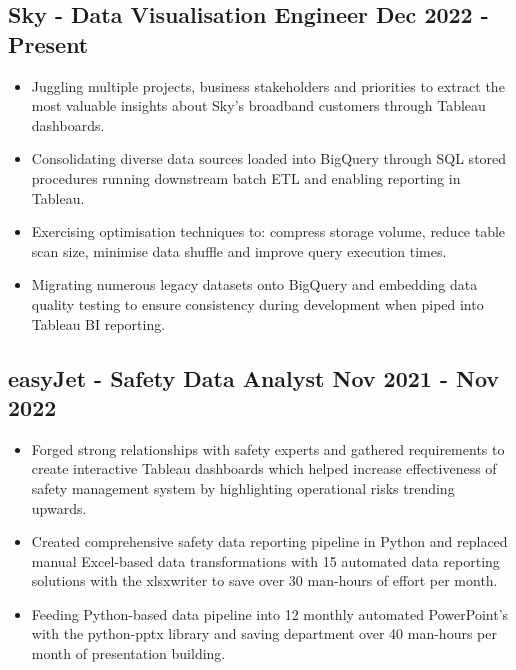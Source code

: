 \documentclass[a4paper,9pt]{article}
\begin{document}
\subsection*{\textbf{Sky - Data Visualisation Engineer} \hfill  Dec 2022 - Present}
\begin{itemize}[noitemsep]
    \item Juggling multiple projects, business stakeholders and priorities to extract the most valuable insights about Sky's broadband customers through Tableau dashboards.
    \item Consolidating diverse data sources loaded into BigQuery through SQL stored procedures running downstream batch ETL and enabling reporting in Tableau.
    \item Exercising optimisation techniques to: compress storage volume, reduce table scan size, minimise data shuffle and improve query execution times.
    \item Migrating numerous legacy datasets onto BigQuery and embedding data quality testing to ensure consistency during development when piped into Tableau BI reporting.
\end{itemize}

\subsection*{\textbf{easyJet - Safety Data Analyst} \hfill  Nov 2021 - Nov 2022}
\begin{itemize}[noitemsep]
    \item Forged strong relationships with safety experts and gathered requirements to create interactive Tableau dashboards which helped increase effectiveness of safety management system by highlighting operational risks trending upwards.
    \item Created comprehensive safety data reporting pipeline in Python and replaced manual Excel-based data transformations with 15 automated data reporting solutions with the xlsxwriter to save over 30 man-hours of effort per month.
    \item Feeding Python-based data pipeline into 12 monthly automated PowerPoint's with the python-pptx library and saving department over 40 man-hours per month of presentation building.
\end{itemize}
\end{document}

